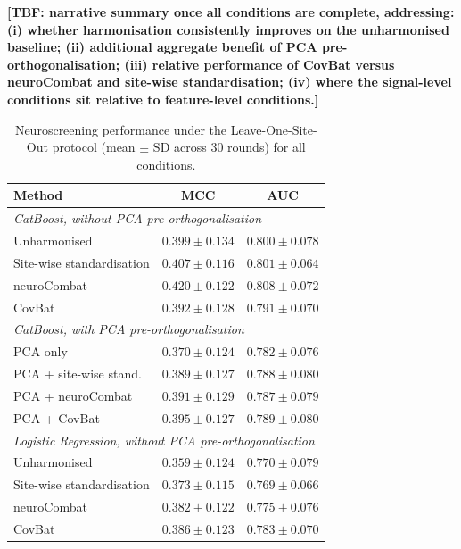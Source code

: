 \documentclass[preprint,12pt]{elsarticle}
\begin{document}
\textbf{[TBF: narrative summary once all conditions are complete,
addressing: (i) whether harmonisation consistently improves on the
unharmonised baseline; (ii) additional aggregate benefit of PCA
pre-orthogonalisation; (iii) relative performance of CovBat versus
neuroCombat and site-wise standardisation; (iv) where the
signal-level conditions sit relative to feature-level conditions.]}

\begin{table}[htbp]
  \centering
  \caption{Neuroscreening performance under the Leave-One-Site-Out
    protocol (mean $\pm$ SD across 30 rounds) for all conditions.
    }
  \label{tab:clinical_loso}
  \begin{tabular}{lcc}
    \toprule
    \textbf{Method} & \textbf{MCC} & \textbf{AUC} \\
    \midrule
    \multicolumn{3}{l}{\textit{CatBoost, without PCA
      pre-orthogonalisation}} \\
    \quad Unharmonised
      & $0.399 \pm 0.134$ & $0.800 \pm 0.078$ \\
    \quad Site-wise standardisation
      & $0.407 \pm 0.116$ & $0.801 \pm 0.064$ \\
    \quad neuroCombat
      & $0.420 \pm 0.122$ & $0.808 \pm 0.072$ \\
    \quad CovBat
      & $0.392 \pm 0.128$ & $0.791 \pm 0.070$ \\
    \midrule
    \multicolumn{3}{l}{\textit{CatBoost, with PCA
      pre-orthogonalisation}} \\
    \quad PCA only
      & $0.370 \pm 0.124$ & $0.782 \pm 0.076$ \\
    \quad PCA + site-wise stand.
      & $0.389 \pm 0.127$ & $0.788 \pm 0.080$ \\
    \quad PCA + neuroCombat
      & $0.391 \pm 0.129$ & $0.787 \pm 0.079$ \\
    \quad PCA + CovBat
      & $0.395 \pm 0.127$ & $0.789 \pm 0.080$ \\
    \midrule
    \multicolumn{3}{l}{\textit{Logistic Regression, without PCA pre-orthogonalisation}} \\
    \quad Unharmonised
      & $0.359 \pm 0.124$ & $0.770 \pm 0.079$ \\
    \quad Site-wise standardisation
      & $0.373 \pm 0.115$ & $0.769 \pm 0.066$ \\
    \quad neuroCombat
      & $0.382 \pm 0.122$ & $0.775 \pm 0.076$ \\
    \quad CovBat
      & $0.386 \pm 0.123$ & $0.783 \pm 0.070$ \\

\end{tabular}
\end{table}
\end{document}
